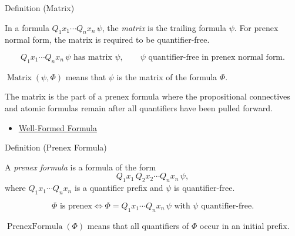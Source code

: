 \begin{definitionbox}{Definition (Matrix)}
\begin{definition}[Matrix]
\label{def:matrix-prenex}
In a formula \(Q_1x_1\cdots Q_nx_n\,\psi\), the \emph{matrix} is the trailing
formula \(\psi\). For prenex normal form, the matrix is required to be
quantifier-free.
\end{definition}
\end{definitionbox}

\begin{remark*}
\[
Q_1x_1\cdots Q_nx_n\,\psi \text{ has matrix } \psi,
\qquad
\psi \text{ quantifier-free in prenex normal form.}
\]
\end{remark*}

\begin{remark*}
\(\operatorname{Matrix}(\psi,\Phi)\) means that \(\psi\) is the matrix of the
formula \(\Phi\).
\end{remark*}

\begin{remark*}[Interpretation]
The matrix is the part of a prenex formula where the propositional connectives
and atomic formulas remain after all quantifiers have been pulled forward.
\end{remark*}

\begin{dependencies}
\begin{itemize}
  \item \hyperref[def:wff-pred]{Well-Formed Formula}
\end{itemize}
\end{dependencies}

\begin{definitionbox}{Definition (Prenex Formula)}
\begin{definition}
\label{def:prenex-formula}
A \emph{prenex formula} is a formula of the form
\[
Q_1x_1\,Q_2x_2\cdots Q_nx_n\,\psi,
\]
where \(Q_1x_1\cdots Q_nx_n\) is a quantifier prefix and \(\psi\) is
quantifier-free.
\end{definition}
\end{definitionbox}

\begin{remark*}
\[
\Phi \text{ is prenex}
\Longleftrightarrow
\Phi=Q_1x_1\cdots Q_nx_n\,\psi
\text{ with } \psi \text{ quantifier-free.}
\]
\end{remark*}

\begin{remark*}
\(\operatorname{PrenexFormula}(\Phi)\) means that all quantifiers of \(\Phi\)
occur in an initial prefix.
\end{remark*}

